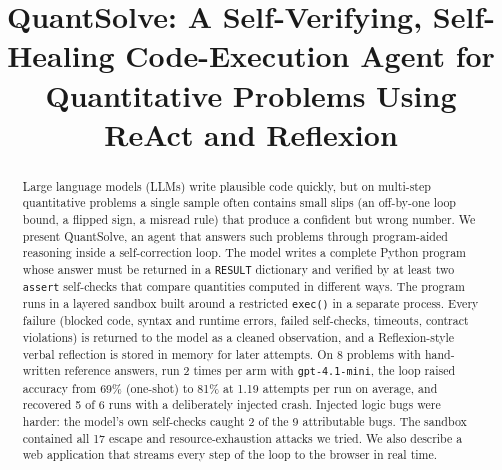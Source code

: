 \documentclass[conference]{IEEEtran}
\begin{document}
\title{QuantSolve: A Self-Verifying, Self-Healing Code-Execution Agent for Quantitative Problems Using ReAct and Reflexion}

\author{
\and
{}
}


\maketitle

\begin{abstract}
Large language models (LLMs) write plausible code quickly, but on multi-step quantitative problems a single sample often contains small slips (an off-by-one loop bound, a flipped sign, a misread rule) that produce a confident but wrong number. We present QuantSolve, an agent that answers such problems through program-aided reasoning inside a self-correction loop. The model writes a complete Python program whose answer must be returned in a \texttt{RESULT} dictionary and verified by at least two \texttt{assert} self-checks that compare quantities computed in different ways. The program runs in a layered sandbox built around a restricted \texttt{exec()} in a separate process. Every failure (blocked code, syntax and runtime errors, failed self-checks, timeouts, contract violations) is returned to the model as a cleaned observation, and a Reflexion-style verbal reflection is stored in memory for later attempts. On 8 problems with hand-written reference answers, run 2 times per arm with \texttt{gpt-4.1-mini}, the loop raised accuracy from 69\% (one-shot) to 81\% at 1.19 attempts per run on average, and recovered 5 of 6 runs with a deliberately injected crash. Injected logic bugs were harder: the model's own self-checks caught 2 of the 9 attributable bugs. The sandbox contained all 17 escape and resource-exhaustion attacks we tried. We also describe a web application that streams every step of the loop to the browser in real time.
\end{abstract}
\end{document}
